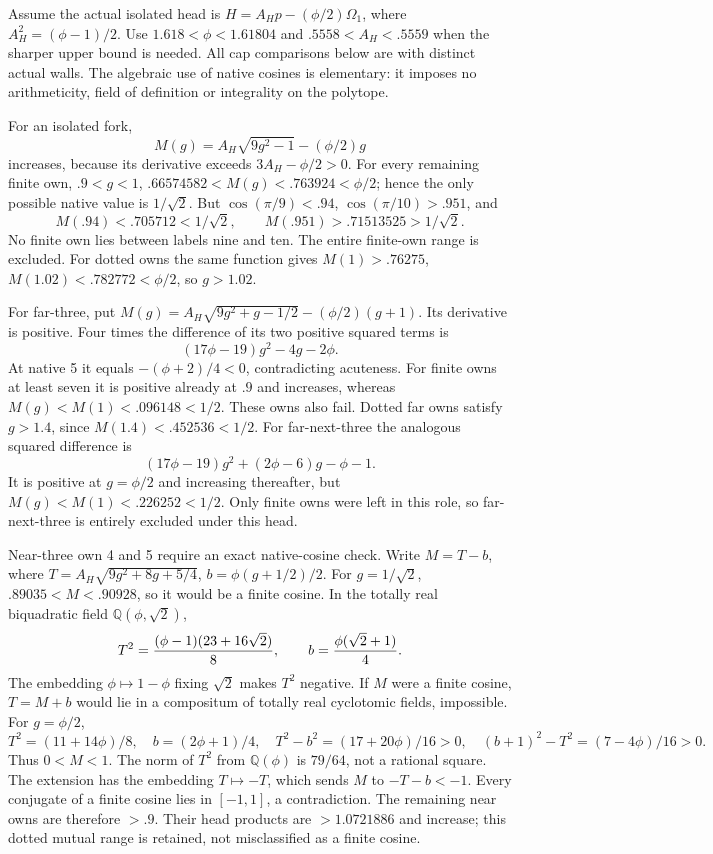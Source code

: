 Assume the actual isolated head is
\(H=A_Hp-(\phi/2)\Omega_1\), where
\(A_H^2=(\phi-1)/2\).
Use \(1.618<\phi<1.61804\) and
\(.5558<A_H<.5559\) when the sharper upper bound is needed.
All cap comparisons below are with distinct actual walls.
The algebraic use of native cosines is elementary: it imposes
no arithmeticity, field of definition or integrality on the polytope.

For an isolated fork,
\[
 M(g)=A_H\sqrt{9g^2-1}-(\phi/2)g
\]
increases, because its derivative exceeds \(3A_H-\phi/2>0\).
For every remaining finite own, \(.9<g<1\),
\(.66574582<M(g)<.763924<\phi/2\); hence the only possible
native value is \(1/\sqrt2\).
But \(\cos(\pi/9)<.94\), \(\cos(\pi/10)>.951\), and
\[
 M(.94)<.705712<1/\sqrt2,\qquad
 M(.951)>.71513525>1/\sqrt2 .
\]
No finite own lies between labels nine and ten.
The entire finite-own range is excluded.
For dotted owns the same function gives
\(M(1)>.76275\), \(M(1.02)<.782772<\phi/2\),
so \(g>1.02\).

For far-three, put
\(M(g)=A_H\sqrt{9g^2+g-1/2}-(\phi/2)(g+1)\).
Its derivative is positive.
Four times the difference of its two positive squared terms is
\[
                  (17\phi-19)g^2-4g-2\phi .
\]
At native 5 it equals \(-(\phi+2)/4<0\), contradicting acuteness.
For finite owns at least seven it is positive already at \(.9\)
and increases, whereas \(M(g)<M(1)<.096148<1/2\).
These owns also fail.
Dotted far owns satisfy \(g>1.4\), since
\(M(1.4)<.452536<1/2\).
For far-next-three the analogous squared difference is
\[
             (17\phi-19)g^2+(2\phi-6)g-\phi-1.
\]
It is positive at \(g=\phi/2\) and increasing thereafter,
but \(M(g)<M(1)<.226252<1/2\).
Only finite owns were left in this role, so far-next-three is
entirely excluded under this head.

Near-three own 4 and 5 require an exact native-cosine check.
Write \(M=T-b\), where
\(T=A_H\sqrt{9g^2+8g+5/4}\),
\(b=\phi(g+1/2)/2\).
For \(g=1/\sqrt2\), \(.89035<M<.90928\), so it would be
a finite cosine.  In the totally real biquadratic field
\(\mathbb Q(\phi,\sqrt2)\),
\[
 T^2={(\phi-1)(23+16\sqrt2)\over8},\qquad
 b={\phi(\sqrt2+1)\over4}.
\]
The embedding \(\phi\mapsto1-\phi\) fixing \(\sqrt2\)
makes \(T^2\) negative.
If \(M\) were a finite cosine, \(T=M+b\) would lie in a
compositum of totally real cyclotomic fields, impossible.
For \(g=\phi/2\),
\[
 T^2=(11+14\phi)/8,\quad b=(2\phi+1)/4,\quad
 T^2-b^2=(17+20\phi)/16>0,\quad
 (b+1)^2-T^2=(7-4\phi)/16>0 .
\]
Thus \(0<M<1\).
The norm of \(T^2\) from \(\mathbb Q(\phi)\) is \(79/64\),
not a rational square.  The extension has the embedding
\(T\mapsto-T\), which sends \(M\) to \(-T-b<-1\).
Every conjugate of a finite cosine lies in \([-1,1]\), a
contradiction.
The remaining near owns are therefore \(>.9\).
Their head products are \(>1.0721886\) and increase; this dotted
mutual range is retained, not misclassified as a finite cosine.

